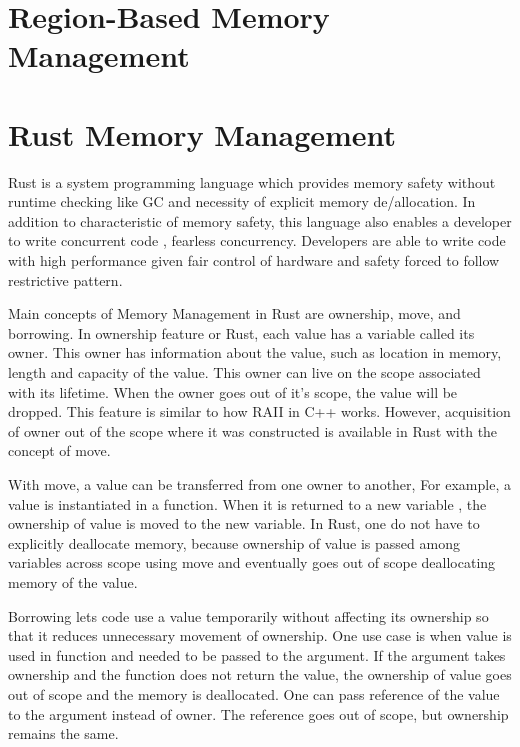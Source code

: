 \section{Region-Based Memory Management}
\label{sec:history}

\section{Rust Memory Management}
\label{sec:history}
Rust is a system programming language which provides memory safety without runtime checking like GC and necessity of explicit memory de/allocation. 
In addition to characteristic of memory safety, this language also enables a developer to write concurrent code , fearless concurrency. 
Developers are able to write code with high performance given fair control of hardware and safety forced to follow restrictive pattern.

Main concepts of Memory Management in Rust are ownership, move, and borrowing. In ownership feature or Rust, each value has a variable called its owner.
This owner has information about the value, such as location in memory, length and capacity of the value. This owner can live on the scope associated with its lifetime.
When the owner goes out of it’s scope, the value will be dropped. This feature is similar to how RAII in C++ works. 
However, acquisition of owner out of the scope where it was constructed is available in Rust with the concept of move. 

With move, a value can be transferred from one owner to another, For example, a value is instantiated in a function. 
When it is returned to a new variable , the ownership of value is moved to the new variable. In Rust, one do not have to explicitly deallocate memory, 
because ownership of value is passed among variables across scope using move and eventually goes out of scope deallocating memory of the value.

Borrowing lets code use a value temporarily without affecting its ownership so that it reduces unnecessary movement of ownership. 
One use case is when value is used in function and needed to be passed to the argument. If the argument takes ownership and the function does not return the value, 
the ownership of value goes out of scope and the memory is deallocated. One can pass reference of the value to the argument instead of owner. 
The reference goes out of scope, but ownership remains the same. 

